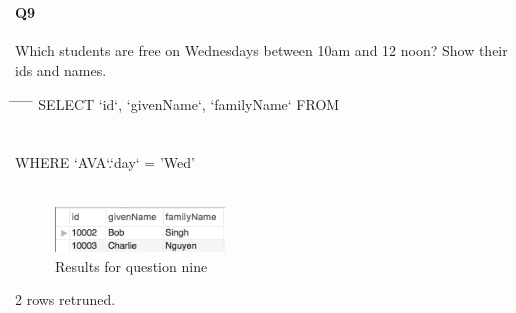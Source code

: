 \documentclass[paper=a4, fontsize=11pt]{scrartcl} %
\numberwithin{equation}{section} %
\numberwithin{figure}{section} %
\numberwithin{table}{section} %
\begin{document}
    \section{ }
    \paragraph{Q9} Which students are free on Wednesdays between 10am and 12 noon? Show their ids and names.
    \begin{center}
        \begin{minipage}{10cm}
        \begin{tabbing}
            \hspace*{.25in} \= \hspace*{.25in} \= \hspace*{.25in} \= \hspace*{.25in} \= \hspace*{.25in} \=\kill
            {\color{blue}SELECT `id`, `givenName`, `familyName` FROM}\\
            \\
            \>\\
           \>\> {\color{blue}WHERE `AVA`.`day` = 'Wed' }\\
            \>\\

        
        \end{tabbing}
        \end{minipage}
    \end{center}
    \begin{figure}[htbp!]
        \centering
        \includegraphics[width=0.4\textwidth]{q91.png}
        \caption{Results for question nine}%
        \vspace{-1em}
    \end{figure}
    {\color{red} 2 rows retruned.}

    \section{ }
\end{document}
